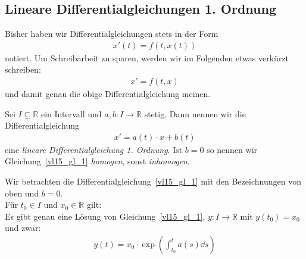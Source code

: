 \subsection{Lineare Differentialgleichungen 1. Ordnung}

\begin{Bemerkung}{
	Bisher haben wir Differentialgleichungen stets in der Form
	\begin{align*}
		x'(t) = f(t,x(t))
	\end{align*}
	notiert. Um Schreibarbeit zu sparen, werden wir im Folgenden etwas
	 verkürzt schreiben:
	 \begin{align*}
	 	x' = f(t,x)
	 \end{align*}
	 und damit genau die obige Differentialgleichung meinen.
}\end{Bemerkung}

\begin{Definition}{
	Sei $I \subseteq \mathbb{R}$ ein Intervall und $a,b: I \rightarrow \mathbb{R}$ 
	stetig. Dann nennen wir die Differentialgleichung
	\begin{align}\label{vl15_gl_1}
		x' = a(t) \cdot x + b(t)
	\end{align}
	eine \emph{lineare Differentialgleichung 1. Ordnung}.
	Ist $b = 0$ so nennen wir Gleichung~\ref{vl15_gl_1} \emph{homogen}, 
	sonst \emph{inhomogen}.
}\end{Definition}


\begin{Satz}{\label{vl_15_satz_1}
	Wir betrachten die Differentialgleichung~\ref{vl15_gl_1} mit den 
	Bezeichnungen von oben und $b = 0$. \\
	Für $t_0 \in I$ und $x_0 \in \mathbb{R}$ gilt: \\
	Es gibt genau eine Lösung von Gleichung~\ref{vl15_gl_1}, 
	$y : I \rightarrow \mathbb{R}$ mit $y(t_0) = x_0$ und zwar:
	\begin{align*}
		y(t) = x_0 \cdot \exp\left( \int_{t_0}^t a(s) \dd{s} \right)
	\end{align*}
}\end{Satz}

